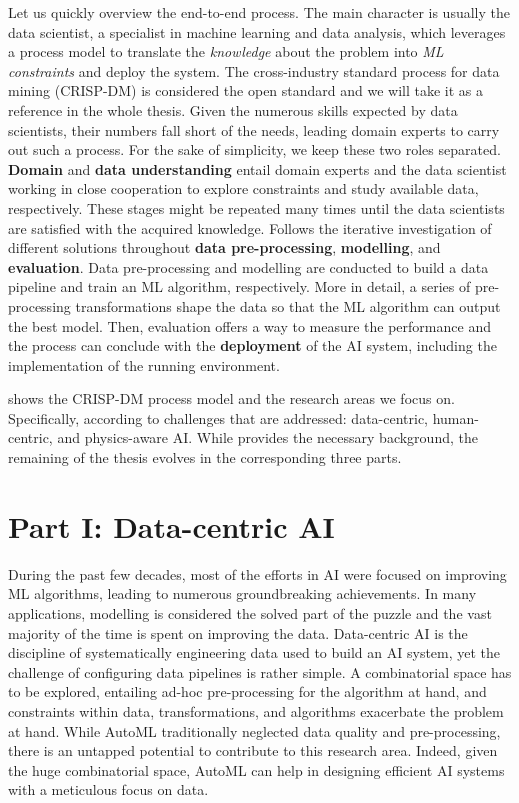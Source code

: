 Let us quickly overview the end-to-end process.
The main character is usually the data scientist, a specialist in machine learning and data analysis, which leverages a process model to translate the \textit{knowledge} about the problem into \textit{ML constraints} and deploy the system.
The cross-industry standard process for data mining \cite{wirth2000crisp} (CRISP-DM) is considered the open standard and we will take it as a reference in the whole thesis.
Given the numerous skills expected by data scientists,
their numbers fall short of the needs,
leading domain experts to carry out such a process.
For the sake of simplicity, we keep these two roles separated.
\textbf{Domain} and \textbf{data understanding} entail domain experts and the data scientist working in close cooperation to explore constraints and study available data, respectively.
These stages might be repeated many times until the data scientists are satisfied with the acquired knowledge.
Follows the iterative investigation of different solutions throughout \textbf{data pre-processing}, \textbf{modelling}, and \textbf{evaluation}.
Data pre-processing and modelling are conducted to build a data pipeline and train an ML algorithm, respectively.
More in detail, a series of pre-processing transformations shape the data so that the ML algorithm can output the best model.
Then, evaluation offers a way to measure the performance and the process can conclude with the \textbf{deployment} of the AI system, including the implementation of the running environment.

 shows the CRISP-DM process model and the research areas we focus on.
Specifically, according to challenges that are addressed: data-centric, human-centric, and physics-aware AI.
While  provides the necessary background, the remaining of the thesis evolves in the corresponding three parts.

\section*{Part I: Data-centric AI}

During the past few decades, most of the efforts in AI were focused on improving ML algorithms, leading to numerous groundbreaking achievements.
In many applications, modelling is considered the solved part of the puzzle and the vast majority of the time is spent on improving the data.
Data-centric AI is the discipline of systematically engineering data used to build an AI system, yet the challenge of configuring data pipelines is rather simple.
A combinatorial space has to be explored, entailing ad-hoc pre-processing for the algorithm at hand, and constraints within data, transformations, and algorithms exacerbate the problem at hand.
While AutoML traditionally neglected data quality and pre-processing, there is an untapped potential to contribute to this research area.
Indeed, given the huge combinatorial space, AutoML can help in designing efficient AI systems with a meticulous focus on data.

